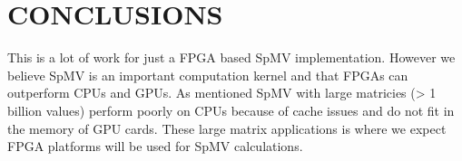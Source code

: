 \chapter{CONCLUSIONS}
This is a lot of work for just a FPGA based SpMV implementation. However we believe SpMV is an important computation kernel and that FPGAs can outperform CPUs and GPUs. As mentioned SpMV with large matricies (> 1 billion values) perform poorly on CPUs because of cache issues and do not fit in the memory of GPU cards. These large matrix applications is where we expect FPGA platforms will be used for SpMV calculations.
